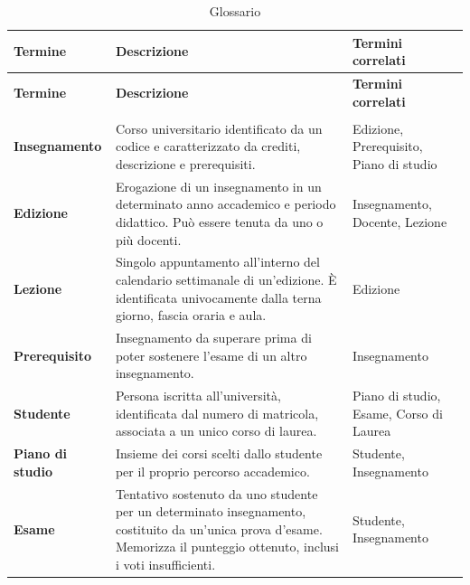 \renewcommand{\arraystretch}{1.4}
\begin{longtable}{ >{\raggedright\arraybackslash}p{3.5cm} >{\raggedright\arraybackslash}p{7.5cm} >{\raggedright\arraybackslash}p{3.5cm}}


    \hline
    \textbf{Termine} & \textbf{Descrizione} & \textbf{Termini correlati} \\
    \hline
    \endfirsthead

    \hline
    \textbf{Termine} & \textbf{Descrizione} & \textbf{Termini correlati} \\
    \hline
    \endhead

    \hline
    \multicolumn{3}{r}{{Continua nella pagina successiva}} \\
    \endfoot

    \hline
    \caption{Glossario} \label{tab:glossario}
    \endlastfoot

    \textbf{Insegnamento} & Corso universitario identificato da un codice e caratterizzato da crediti, descrizione e prerequisiti. & Edizione, Prerequisito, Piano di studio \\

    \textbf{Edizione} & Erogazione di un insegnamento in un determinato anno accademico e periodo didattico. Può essere tenuta da uno o più docenti. & Insegnamento, Docente, Lezione \\

    \textbf{Lezione} & Singolo appuntamento all'interno del calendario settimanale di un'edizione. È identificata univocamente dalla terna giorno, fascia oraria e aula. & Edizione \\

    \textbf{Prerequisito} & Insegnamento da superare prima di poter sostenere l'esame di un altro insegnamento. & Insegnamento \\

    \textbf{Studente} & Persona iscritta all'università, identificata dal numero di matricola, associata a un unico corso di laurea. & Piano di studio, Esame, Corso di Laurea \\

    \textbf{Piano di studio} & Insieme dei corsi scelti dallo studente per il proprio percorso accademico. & Studente, Insegnamento \\

    \textbf{Esame} & Tentativo sostenuto da uno studente per un determinato insegnamento, costituito da un'unica prova d'esame. Memorizza il punteggio ottenuto, inclusi i voti insufficienti. & Studente, Insegnamento \\


\end{longtable}
